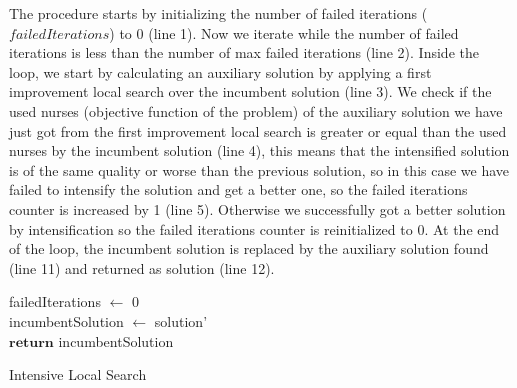 The procedure starts by initializing the number of failed iterations ($failedIterations$) to 0 (line 1). Now we iterate while the number of failed iterations is less than the number of max failed iterations (line 2). Inside the loop, we start by calculating an auxiliary solution by applying a first improvement local search over the incumbent solution (line 3). We check if the used nurses (objective function of the problem) of the auxiliary solution we have just got from the first improvement local search is greater or equal than the  used nurses by the incumbent solution (line 4), this means that the intensified solution is of the same quality or worse than the previous solution, so in this case we have failed to intensify the solution and get a better one, so the failed iterations counter is increased by 1 (line 5). Otherwise we successfully got a better solution by intensification so the failed iterations counter is reinitialized to 0. At the end of the loop, the incumbent solution is replaced by the auxiliary solution found (line 11) and returned as solution (line 12).

\begin{algorithm}[H]


failedIterations $\leftarrow$ 0 \\
incumbentSolution $\leftarrow$ solution'\\
$\textbf{return}$ incumbentSolution
\caption{Intensive Local Search}\label{alg.mainLoop}
\end{algorithm}

